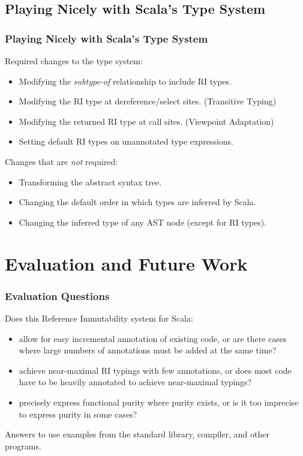 \documentclass{beamer}
\newcommand{\code}[1]{\lstinline$#1$}
\begin{document}
	\subsection{Playing Nicely with Scala's Type System}

\begin{frame}
\frametitle{Playing Nicely with Scala's Type System}
Required changes to the type system:
\begin{itemize}
	\item Modifying the \emph{subtype-of} relationship to include RI types.
	\item Modifying the RI type at dereference/select sites. (Transitive Typing)
	\item Modifying the returned RI type at call sites. (Viewpoint Adaptation)  %
	\item Setting default RI types on unannotated type expressions.
\end{itemize}
Changes that are \emph{not} required:
\begin{itemize}
\item Transforming the abstract syntax tree.
\item Changing the default order in which types are inferred by Scala.
\item Changing the inferred type of any AST node (except for RI types).
\end{itemize}
\end{frame}

\section{Evaluation and Future Work}
	

\begin{frame}
\frametitle{Evaluation Questions}
Does this Reference Immutability system for Scala:
\begin{itemize}
	\item allow for easy incremental annotation
	of existing code, or are there cases where large numbers of annotations must
	be added at the same time?
	\item achieve near-maximal RI typings with few annotations,
	or does most code have to be heavily annotated to achieve near-maximal typings?
	\item precisely express functional purity where purity exists,
	or is it too imprecise to express purity in some cases?
\end{itemize}
Answers to use examples from the standard library, compiler,
and other programs.
\end{frame}
\end{document}
